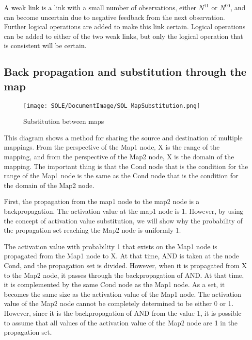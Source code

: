 \documentclass[12pt]{article}
\begin{document}
A weak link is a link with a small number of observations, either
\(N^{11}\) or \(N^{00}\), and can become uncertain due to negative
feedback from the next observation. Further logical operations are added
to make this link certain. Logical operations can be added to either of
the two weak links, but only the logical operation that is consistent
will be certain.

\subsection{Back propagation and substitution through the map}\label{back-propagation-and-substitution-through-the-map}

\begin{figure}[ht]
  \centering
  \texttt{[image: SOLE/DocumentImage/SOL\_MapSubstitution.png]}
  \caption{Substitution between maps}
  \label{fig:substitution_between_maps}
\end{figure}

This diagram shows a method for sharing the source and destination of
multiple mappings. From the perspective of the Map1 node, X is the range
of the mapping, and from the perspective of the Map2 node, X is the
domain of the mapping. The important thing is that the Cond node that is
the condition for the range of the Map1 node is the same as the Cond
node that is the condition for the domain of the Map2 node.

First, the propagation from the map1 node to the map2 node is a
backpropagation. The activation value at the map1 node is 1. However, by
using the concept of activation value substitution, we will show why the
probability of the propagation set reaching the Map2 node is uniformly
1.

The activation value with probability 1 that exists on the Map1 node is
propagated from the Map1 node to X. At that time, AND is taken at the
node Cond, and the propagation set is divided. However, when it is
propagated from X to the Map2 node, it passes through the
backpropagation of AND. At that time, it is complemented by the same
Cond node as the Map1 node. As a set, it becomes the same size as the
activation value of the Map1 node. The activation value of the Map2 node
cannot be completely determined to be either 0 or 1. However, since it
is the backpropagation of AND from the value 1, it is possible to assume
that all values \hspace{0pt}\hspace{0pt}of the activation value of the
Map2 node are 1 in the propagation set.
\end{document}
